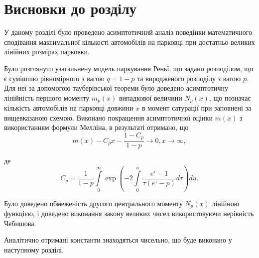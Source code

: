 \section*{Висновки до розділу}
У даному розділі було проведено асимптотичний аналіз поведінки математичного сподівання максимальної кількості автомобілів на парковці при достатньо великих лінійних розмірах парковки.

Було розглянуто узагальнену модель паркування Реньї, що задано розподілом, що є сумішшю рівномірного з вагою $q=1-p$ та виродженого розподілу з вагою $p$. Для неї за допомогою тауберівської теореми було доведено асимптотичну лінійність першого моменту $m_{p}(x)$ випадкової величини $N_{p}(x)$, що позначає кількість автомобілів на парковці довжини $x$ в момент сатурації при заповнені за вищевказаною схемою. Виконано покращення асимптотичної оцінки $m(x)$ з використанням формули Мелліна, в результаті отримано, що
\begin{equation*}
m(x) - C_{p} x - \frac{1 - C_{p}}{1 - p} \rightarrow 0, x \rightarrow \infty,
\end{equation*}

де
\begin{equation*}
C_{p} = \frac{1}{1-p} \int\limits_0^\infty \exp\left( -2\int\limits_0^u \frac{e^{\tau} - 1}{\tau(e^\tau - p)} d\tau  \right) du.
\end{equation*}

Було доведено обмеженість другого центрального моменту $N_{p}(x)$ лінійною функцією, і доведено виконання закону великих чисел використовуючи нерівність Чебишова.

Аналітично отримані константи знаходяться чисельно, що буде виконано у наступному розділі.
